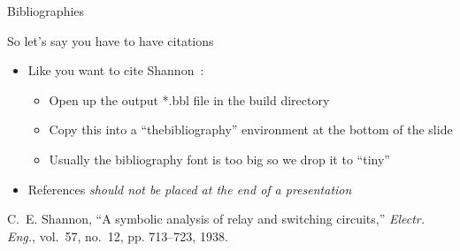 \documentclass[handout]{beamer}
\begin{document}
\begin{frame}{Bibliographies}
  \begin{block}{So let's say you have to have citations}
    \begin{itemize}
    \item Like you want to cite Shannon~\cite{shannon1938}:
      \begin{itemize}
      \item Open up the output *.bbl file in the build directory
      \item Copy this into a ``thebibliography'' environment at the bottom of the slide
      \item Usually the bibliography font is too big so we drop it to ``tiny''
      \end{itemize}
    \item References \emph{should not be placed at the end of a presentation}
    \end{itemize}
  \end{block}
  \begin{thebibliography}{} \tiny
    C.~E. Shannon, ``A symbolic analysis of relay and switching circuits,''
    \emph{Electr. Eng.}, vol.~57, no.~12, pp. 713--723, 1938.
  \end{thebibliography}
\end{frame}
\end{document}
